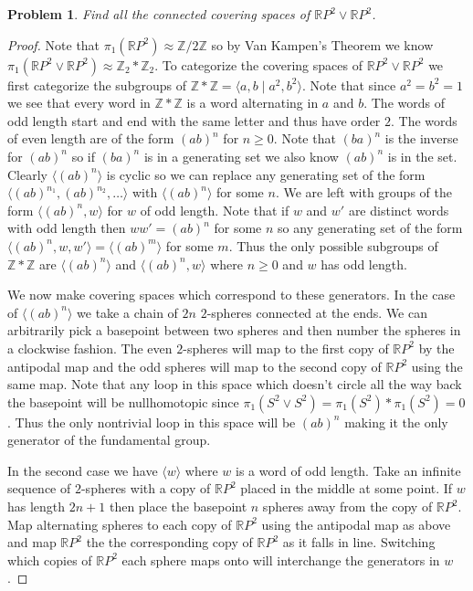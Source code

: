\documentclass{article}
\newtheorem{problem}{Problem}
\begin{document}
\begin{problem}
Find all the connected covering spaces of $\mathbb{R}P^2 \vee \mathbb{R}P^2$.
\end{problem}
\begin{proof}
Note that $\pi_1(\mathbb{R}P^2) \approx \mathbb{Z}/2\mathbb{Z}$ so by Van Kampen's Theorem we know $\pi_1(\mathbb{R}P^2 \vee \mathbb{R}P^2) \approx \mathbb{Z}_2 * \mathbb{Z}_2$. To categorize the covering spaces of $\mathbb{R}P^2 \vee \mathbb{R}P^2$ we first categorize the subgroups of $\mathbb{Z} * \mathbb{Z} = \langle a,b \mid a^2, b^2 \rangle$. Note that since $a^2 = b^2 = 1$ we see that every word in $\mathbb{Z} * \mathbb{Z}$ is a word alternating in $a$ and $b$. The words of odd length start and end with the same letter and thus have order $2$. The words of even length are of the form $(ab)^n$ for $n \geq 0$. Note that $(ba)^n$ is the inverse for $(ab)^n$ so if $(ba)^n$ is in a generating set we also know $(ab)^n$ is in the set. Clearly $\langle (ab)^n \rangle$ is cyclic so we can replace any generating set of the form $\langle (ab)^{n_1}, (ab)^{n_2}, \dots \rangle$ with $\langle (ab)^n \rangle$ for some $n$. We are left with groups of the form $\langle (ab)^n, w \rangle$ for $w$ of odd length. Note that if $w$ and $w'$ are distinct words with odd length then $ww' = (ab)^n$ for some $n$ so any generating set of the form $\langle (ab)^n, w, w' \rangle = \langle (ab)^m \rangle$ for some $m$. Thus the only possible subgroups of $\mathbb{Z} * \mathbb{Z}$ are $\langle (ab)^n \rangle$ and $\langle (ab)^n, w \rangle$ where $n \geq 0$ and $w$ has odd length.

We now make covering spaces which correspond to these generators. In the case of $\langle (ab)^n \rangle$ we take a chain of $2n$ $2$-spheres connected at the ends. We can arbitrarily pick a basepoint between two spheres and then number the spheres in a clockwise fashion. The even $2$-spheres will map to the first copy of $\mathbb{R}P^2$ by the antipodal map and the odd spheres will map to the second copy of $\mathbb{R}P^2$ using the same map. Note that any loop in this space which doesn't circle all the way back the basepoint will be nullhomotopic since $\pi_1(S^2 \vee S^2) = \pi_1(S^2) * \pi_1(S^2) = 0$. Thus the only nontrivial loop in this space will be $(ab)^n$ making it the only generator of the fundamental group.
\vspace{200pt}

In the second case we have $\langle w \rangle$ where $w$ is a word of odd length. Take an infinite sequence of $2$-spheres with a copy of $\mathbb{R}P^2$ placed in the middle at some point. If $w$ has length $2n+1$ then place the basepoint $n$ spheres away from the copy of $\mathbb{R}P^2$. Map alternating spheres to each copy of $\mathbb{R}P^2$ using the antipodal map as above and map $\mathbb{R}P^2$ the the corresponding copy of $\mathbb{R}P^2$ as it falls in line. Switching which copies of $\mathbb{R}P^2$ each sphere maps onto will interchange the generators in $w$.


\end{proof}
\end{document}
